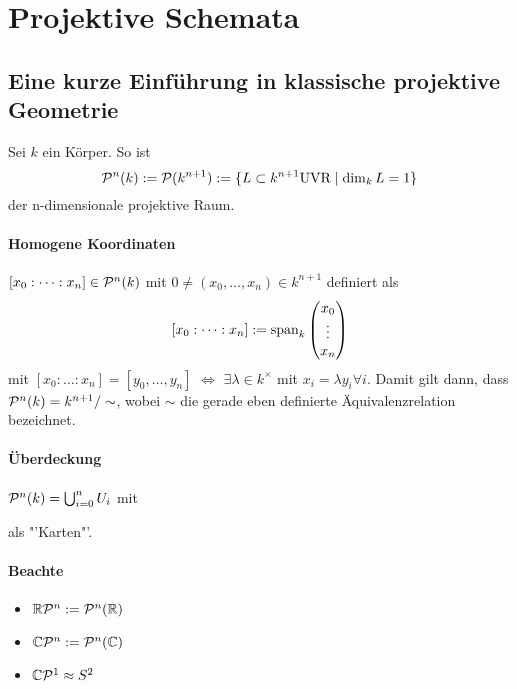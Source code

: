 \section{Projektive Schemata}

\subsection{Eine kurze Einführung in klassische projektive Geometrie}
Sei $k$ ein Körper. So ist
\[
\P^n(k):=\P(k^{n+1}):=\{L\subset k^{n+1} \text{UVR}\mid \dim_k L=1\}
\]
der n-dimensionale projektive Raum.
\paragraph{Homogene Koordinaten} $[x_0:\dots:x_n]\in\P^n(k)$ mit
$0\neq(x_0,\dots,x_n)\in k^{n+1}$ definiert als
\[
[x_0:\dots:x_n]:=\Span_k \begin{pmatrix}x_{0}\\ \vdots\\ x_{n} \end{pmatrix} 
\]
mit $[x_0:\dots:x_n]=[y_0,\dots,y_n]$ $\Leftrightarrow$ $\exists \lambda \in
k^\times$ mit $x_i=\lambda y_i \forall i$.
Damit gilt dann, dass $\P^n(k)=k^{n+1}/\sim$, wobei $\sim$ die gerade eben
definierte Äquivalenzrelation bezeichnet.
\paragraph{Überdeckung}
$\P^n(k)=\bigcup_{i=0}^nU_i$ mit
\begin{center}
\end{center}
als "'Karten"'.
\paragraph{Beachte}
\begin{bemerkung}
\begin{itemize}
    \item $\R\P^n:=\P^n(\R)$
    \item $\C\P^n:=\P^n(\C)$
    \item $\C\P^1\approx S^2$
\end{itemize}
\end{bemerkung}

